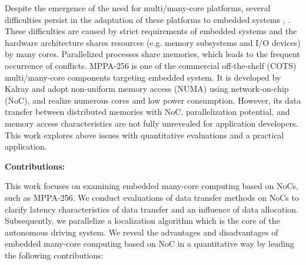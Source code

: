 \documentclass[conference,compsoc]{IEEEtran}
\newcommand{\comment}[1]{}
\begin{document}
Despite the emergence of the need for multi/many-core platforms, several difficulties persist in the adaptation of these platforms to embedded systems \cite{becker2016contention}, \cite{saidi2015shift}.
These difficulties are caused by strict requirements of embedded systems and the hardware architecture shares resources (e.g. memory subsystems and I/O devices) by many cores.
Parallelized processes share memories, which leads to the frequent occurrence of conflicts.
MPPA-256 \cite{de2014time} is one of the commercial off-the-shelf (COTS) multi/many-core components targeting embedded system.
It is developed by Kalray and adopt non-uniform memory access (NUMA) using network-on-chip (NoC), and realize numerous cores and low power consumption.
However, its data transfer between distributed memories with NoC, parallelization potential, and memory access characteristics are not fully unrevealed for application developers.
This work explores above issues with quantitative evaluations and a practical application.


\textbf{Contributions:}
\comment{1-1, 3-3: To be clarified}
This work focuses on examining embedded many-core computing based on NoCs, such as MPPA-256.
We conduct evaluations of data transfer methods on NoCs to clarify latency characteristics of data transfer and an influence of data allocation.
Subsequently, we parallelize a localization algorithm which is the core of the autonomous driving system.
We reveal the advantages and disadvantages of embedded many-core computing based on NoC in a quantitative way by leading the following contributions:
\end{document}
